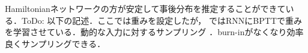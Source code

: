 Hamiltonianネットワークの方が安定して事後分布を推定することができている．ToDo: 以下の記述．ここでは重みを設定したが， \cite{Echeveste2020-sh}ではRNNにBPTTで重みを学習させている．動的な入力に対するサンプリング \cite{Berkes2011-xj}．burn-inがなくなり効率良くサンプリングできる．
